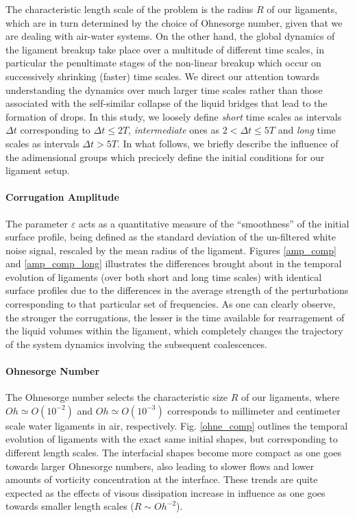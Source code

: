 The characteristic length scale of the problem is the radius $R$ of our ligaments, 
which are in turn determined by the choice of Ohnesorge number, given that we are dealing with air-water systems.
On the other hand, the global dynamics of the ligament breakup take place over a multitude of different time scales, 
in particular the penultimate stages of the non-linear breakup which occur on successively shrinking (faster) time scales.  
We direct our attention towards understanding the dynamics over much larger time scales rather than those  
associated with the self-similar collapse of the liquid bridges that lead to the formation of drops. 
In this study, we loosely define \textit{short} time scales as intervals $\Delta t$ corresponding 
to $ \Delta t \leq 2T $, \textit{intermediate} ones as $ 2 < \Delta t \leq 5T $ 
and \textit{long} time scales as intervals $\Delta t > 5T$. 
In what follows, we briefly describe the influence of the adimensional 
groups which precicely define the initial conditions for our ligament setup.  


\paragraph{Corrugation Amplitude}
The parameter $\varepsilon$ acts as a quantitative measure of the ``smoothness'' 
of the initial surface profile, being defined as the standard deviation 
of the un-filtered white noise signal, rescaled by the mean radius of the ligament.
Figures \ref{amp_comp} and \ref{amp_comp_long} illustrates the differences brought about in the temporal
evolution of ligaments (over both short and long time scales) with identical surface profiles 
due to the differences in the average strength of the perturbations corresponding to that particular set of frequencies. 
As one can clearly observe, the stronger the corrugations, 
the lesser is the time available for rearragement of the liquid 
volumes within the ligament, which completely changes the trajectory of 
the system dynamics involving the subsequent coalescences.    

\paragraph{Ohnesorge Number}
The Ohnesorge number selects the characteristic size $R$ of our ligaments, 
where $Oh \simeq O(10^{-2})$ and $Oh \simeq O(10^{-3})$ corresponds to 
millimeter and centimeter scale water ligaments in air, respectively.  
Fig. \ref{ohne_comp} outlines the temporal evolution of ligaments with   
the exact same initial shapes, but corresponding to different length scales. 
The interfacial shapes become more compact as one goes towards larger Ohnesorge
numbers, also leading to slower flows and lower amounts of vorticity concentration at the interface.  
These trends are quite expected as the effects of visous dissipation increase in influence
as one goes towards smaller length scales ($R \sim Oh^{-2}$).

